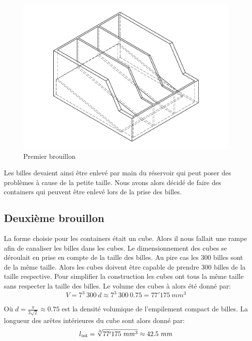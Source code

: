 \begin{figure}
    \centering
    \includegraphics[width=\textwidth]{Graphics/Reservoir_final/PREMIER_BROUILLON.pdf}
    \caption{Premier brouillon}
\end{figure}

Les billes devaient ainsi être enlevé par main du réservoir qui peut poser des problèmes à cause de la petite taille. Nous avons alors décidé de faire des containers qui peuvent être enlevé lors de la prise des billes. 

\subsection{Deuxième brouillon}
La forme choisie pour les containers était un cube. Alors il nous fallait une rampe afin de canaliser les billes dans les cubes.  Le dimensionnement des cubes se déroulait en prise en compte de la taille des billes. Au pire cas les 300 billes sont de la même taille. Alors les cubes doivent être capable de prendre 300 billes de la taille respective. Pour simplifier la construction les cubes ont tous la même taille sans respecter la taille des billes. Le volume des cubes à alors été donné par:
\begin{equation}
    V = 7^3\ 300\ d \approx 7^3\ 300\ 0.75 = 77'175\ mm^3
    \label{eq:volumereservoirfin}
\end{equation}

Où \(d = \frac{ \pi }{3\sqrt{2}} \approx 0.75\) est la densité volumique de l'empilement compact de billes. La longueur des arêtes intérieures du cube sont alors donné par: 
\[l\textsubscript{int}=\sqrt[3]{77'175\ mm^3} \approx 42.5\ mm\]

